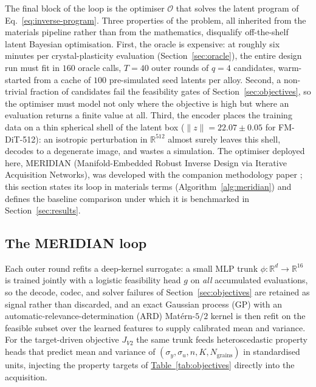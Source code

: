 \documentclass[preprint,12pt]{elsarticle}
\newcommand{\tabref}[1]{\hyperref[#1]{Table~\ref*{#1}}}
\begin{document}
The final block of the loop is the optimiser $\mathcal{O}$ that solves the latent program of Eq.~\eqref{eq:inverse-program}. Three properties of the problem, all inherited from the materials pipeline rather than from the mathematics, disqualify off-the-shelf latent Bayesian optimisation. First, the oracle is expensive: at roughly six minutes per crystal-plasticity evaluation (Section~\ref{sec:oracle}), the entire design run must fit in $160$ oracle calls, $T = 40$ outer rounds of $q = 4$ candidates, warm-started from a cache of $100$ pre-simulated seed latents per alloy. Second, a non-trivial fraction of candidates fail the feasibility gates of Section~\ref{sec:objectives}, so the optimiser must model not only where the objective is high but where an evaluation returns a finite value at all. Third, the encoder places the training data on a thin spherical shell of the latent box ($\|z\| = 22.07 \pm 0.05$ for FM-DiT-512): an isotropic perturbation in $\mathbb{R}^{512}$ almost surely leaves this shell, decodes to a degenerate image, and wastes a simulation. The optimiser deployed here, MERIDIAN (Manifold-Embedded Robust Inverse Design via Iterative Acquisition Networks), was developed with the companion methodology paper {\color{red}\cite{CoPiLOT2026}}; this section states its loop in materials terms (Algorithm~\ref{alg:meridian}) and defines the baseline comparison under which it is benchmarked in Section~\ref{sec:results}.

\subsection{The MERIDIAN loop}
\label{sec:meridian-loop}

Each outer round refits a deep-kernel surrogate: a small MLP trunk $\phi:\mathbb{R}^{d}\to\mathbb{R}^{16}$ is trained jointly with a logistic feasibility head $g$ on \emph{all} accumulated evaluations, so the decode, codec, and solver failures of Section~\ref{sec:objectives} are retained as signal rather than discarded, and an exact Gaussian process (GP) with an automatic-relevance-determination (ARD) Mat\'ern-$5/2$ kernel is then refit on the feasible subset over the learned features to supply calibrated mean and variance. For the target-driven objective $J_{V2}$ the same trunk feeds heteroscedastic property heads that predict mean and variance of $(\sigma_y, \sigma_u, n, K, N_{\mathrm{grains}})$ in standardised units, injecting the property targets of \tabref{tab:objectives} directly into the acquisition.
\end{document}
